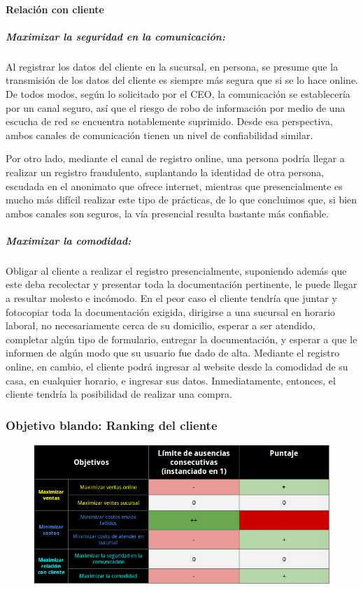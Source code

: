 \paragraph{Relación con cliente}

\subparagraph{Maximizar la seguridad en la comunicación:}

Al registrar los datos del cliente en la sucursal, en persona, se presume que la
transmisión de los datos del cliente es siempre más segura que si se lo hace
online. De todos modos, según lo solicitado por el CEO, la comunicación se
establecería por un canal seguro, así que el riesgo de robo de información por
medio de una escucha de red se encuentra notablemente suprimido. Desde esa
perspectiva, ambos canales de comunicación tienen un nivel de confiabilidad
similar.

Por otro lado, mediante el canal de registro online, una persona podría llegar a
realizar un registro fraudulento, suplantando la identidad de otra persona,
escudada en el anonimato que ofrece internet, mientras que presencialmente es
mucho más difícil realizar este tipo de prácticas, de lo que concluimos que, si
bien ambos canales son seguros, la vía presencial resulta bastante más
confiable.

\subparagraph{Maximizar la comodidad:}

Obligar al cliente a realizar el registro presencialmente, suponiendo además que
este deba recolectar y presentar toda la documentación pertinente, le puede
llegar a resultar molesto e incómodo. En el peor caso el cliente tendría que
juntar y fotocopiar toda la documentación exigida, dirigirse a una sucursal en
horario laboral, no necesariamente cerca de su domicilio, esperar a ser
atendido, completar algún tipo de formulario, entregar la documentación, y
esperar a que le informen de algún modo que su usuario fue dado de alta.
Mediante el registro online, en cambio, el cliente podrá ingresar al website
desde la comodidad de su casa, en cualquier horario, e ingresar sus datos.
Inmediatamente, entonces, el cliente tendría la posibilidad de realizar una
compra.

\newpage
\subsubsection{Objetivo blando: Ranking del cliente}
\begin{figure}[H]
  \includegraphics[width=\linewidth]{images/objetivo-blando-ranking-cliente.png}
\end{figure}

